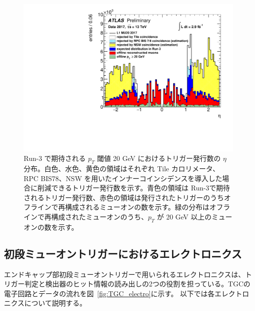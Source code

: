 \begin{figure}[tb]
  \centering
    \includegraphics[clip, width=14cm]{fig/3/ATL-COM-DAQ-2018-033-fig2.pdf}
  \caption{Run-3 で期待される $p_T$ 閾値 20 GeV におけるトリガー発行数の $\eta$ 分布。白色、水色、黄色の領域はそれぞれ Tile カロリメータ、RPC BIS78、NSW を用いたインナーコインシデンスを導入した場合に削減できるトリガー発行数を示す。青色の領域は Run-3で期待されるトリガー発行数、赤色の領域は発行されたトリガーのうちオフラインで再構成されるミューオンの数を示す。緑の分布はオフラインで再構成されたミューオンのうち、$p_T$ が 20 GeV 以上のミューオンの数を示す。}
  \label{fig:Rate_innercoincidence}
\end{figure}

\subsection{初段ミューオントリガーにおけるエレクトロニクス}
エンドキャップ部初段ミューオントリガーで用いられるエレクトロニクスは、トリガー判定と検出器のヒット情報の読み出しの2つの役割を担っている。TGCの電子回路とデータの流れを図~\ref{fig:TGC_electro}に示す。
以下では各エレクトロニクスについて説明する。

